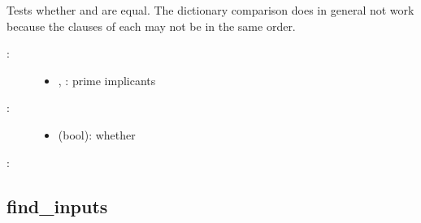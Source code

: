 \documentclass[letterpaper,10pt,english]{sphinxmanual}
\begin{document}
\begin{fulllineitems}
\label{\detokenize{PrimeImplicants:PyBoolNet.PrimeImplicants.are_equal}}
Tests whether  and  are equal.
The dictionary comparison  does in general not work because the clauses of each may not be in the same order.
\begin{description}
\item[{:}] \leavevmode\begin{itemize}
\item {} 
, : prime implicants

\end{itemize}

\item[{:}] \leavevmode\begin{itemize}
\item {} 
 (bool): whether 

\end{itemize}

\end{description}

:

\begin{sphinxVerbatim}[commandchars=\\\{\}]
 
\end{sphinxVerbatim}

\end{fulllineitems}



\subsection{find\_inputs}
\label{\detokenize{PrimeImplicants:id3}}\label{\detokenize{PrimeImplicants:find-inputs}}
\end{document}
